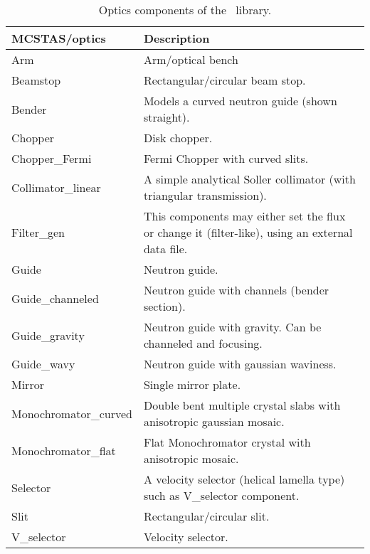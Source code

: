 \begin{table}
  \begin{center}
    {\let\my=\\
    \begin{tabular}{|p{}|p{}|}
      \hline
       {\bf MCSTAS/optics} & Description \\
       \hline
Arm                &  Arm/optical bench \\
 Beamstop          &   Rectangular/circular
                      beam stop. \\
 Bender            &   Models a curved
                      neutron guide (shown straight). \\
 Chopper           &   Disk chopper. \\
 Chopper\_Fermi     &   Fermi Chopper with
                      curved slits. \\
 Collimator\_linear &  A simple analytical Soller collimator
                      (with triangular
                      transmission).  \\
 Filter\_gen        &   This components may
                      either set the flux
                      or change it (filter-like), using
                      an external data
                      file. \\
 Guide             &   Neutron guide. \\
 Guide\_channeled   &   Neutron guide with
                      channels (bender
                      section). \\
 Guide\_gravity     &  Neutron guide with gravity. Can be
                      channeled and focusing. \\

 Guide\_wavy        &   Neutron guide with
                      gaussian waviness. \\

 Mirror             &  Single mirror plate. \\


 Monochromator\_curved & Double bent multiple crystal
                      slabs with anisotropic gaussian
                      mosaic. \\

 Monochromator\_flat &  Flat Monochromator
                      crystal with
                      anisotropic mosaic. \\

 Selector            & A velocity selector
                      (helical lamella
                      type) such as
                      V\_selector component. \\

 Slit                & Rectangular/circular
                      slit. \\

 V\_selector          & Velocity selector. \\
      \hline
    \end{tabular}
    \caption{Optics components of the \MCS\ library.}
    \label{t:comp-optics}
    }
  \end{center}
\end{table}


